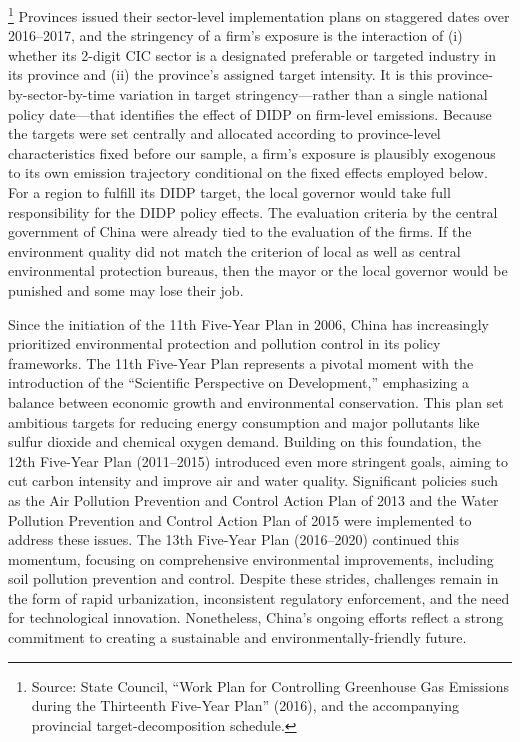 \documentclass[11pt,a4paper]{article}
\begin{document}
\footnote{Source: State Council, ``Work Plan for Controlling Greenhouse Gas Emissions during the Thirteenth Five-Year Plan'' (2016), and the accompanying provincial target-decomposition schedule.} Provinces issued their sector-level implementation plans on staggered dates over 2016--2017, and the stringency of a firm's exposure is the interaction of (i) whether its 2-digit CIC sector is a designated preferable or targeted industry in its province and (ii) the province's assigned target intensity. It is this province-by-sector-by-time variation in target stringency---rather than a single national policy date---that identifies the effect of DIDP on firm-level emissions. Because the targets were set centrally and allocated according to province-level characteristics fixed before our sample, a firm's exposure is plausibly exogenous to its own emission trajectory conditional on the fixed effects employed below. For a region to fulfill its DIDP target, the local governor would take full responsibility for the DIDP policy effects. The evaluation criteria by the central government of China were already tied to the evaluation of the firms. If the environment quality did not match the criterion of local as well as central environmental protection bureaus, then the mayor or the local governor would be punished and some may lose their job.

Since the initiation of the 11th Five-Year Plan in 2006, China has increasingly prioritized environmental protection and pollution control in its policy frameworks. The 11th Five-Year Plan represents a pivotal moment with the introduction of the ``Scientific Perspective on Development,'' emphasizing a balance between economic growth and environmental conservation. This plan set ambitious targets for reducing energy consumption and major pollutants like sulfur dioxide and chemical oxygen demand. Building on this foundation, the 12th Five-Year Plan (2011--2015) introduced even more stringent goals, aiming to cut carbon intensity and improve air and water quality. Significant policies such as the Air Pollution Prevention and Control Action Plan of 2013 and the Water Pollution Prevention and Control Action Plan of 2015 were implemented to address these issues. The 13th Five-Year Plan (2016--2020) continued this momentum, focusing on comprehensive environmental improvements, including soil pollution prevention and control. Despite these strides, challenges remain in the form of rapid urbanization, inconsistent regulatory enforcement, and the need for technological innovation. Nonetheless, China's ongoing efforts reflect a strong commitment to creating a sustainable and environmentally-friendly future.
\end{document}
